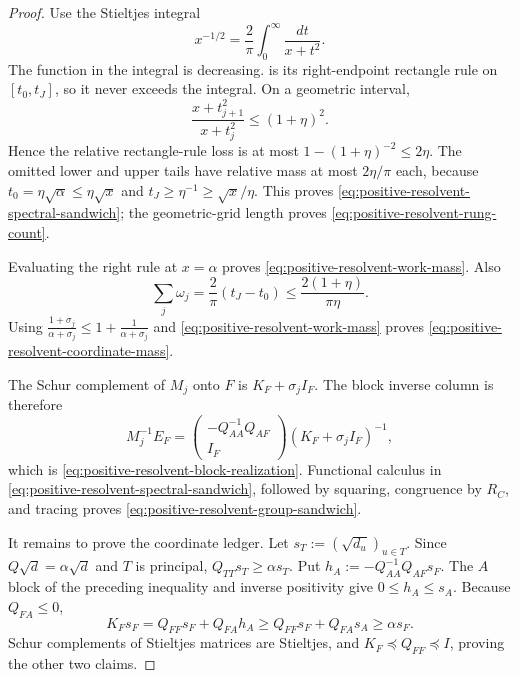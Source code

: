 \begin{proof}
Use the Stieltjes integral
\begin{equation*}
 x^{-1/2}=\frac2\pi\int_0^\infty\frac{dt}{x+t^2}.
\end{equation*}
The function in the integral is decreasing.
 is its right-endpoint rectangle rule on
$[t_0,t_J]$, so it never exceeds the integral.  On a geometric interval,
\begin{equation*}
 \frac{x+t_{j+1}^2}{x+t_j^2}\leq(1+\eta)^2.
\end{equation*}
Hence the relative rectangle-rule loss is at most
$1-(1+\eta)^{-2}\leq2\eta$.  The omitted lower and upper tails have relative
mass at most $2\eta/\pi$ each, because
$t_0=\eta\sqrt\alpha\leq\eta\sqrt x$ and
$t_J\geq\eta^{-1}\geq\sqrt x/\eta$.  This proves
\cref{eq:positive-resolvent-spectral-sandwich}; the geometric-grid length
proves
\cref{eq:positive-resolvent-rung-count}.

Evaluating the right rule at $x=\alpha$ proves
\cref{eq:positive-resolvent-work-mass}.  Also
\begin{equation*}
 \sum_j\omega_j
 =\frac2\pi(t_J-t_0)
 \leq\frac{2(1+\eta)}{\pi\eta}.
\end{equation*}
Using
$\frac{1+\sigma_j}{\alpha+\sigma_j}
 \leq 1+\frac1{\alpha+\sigma_j}$ and
\cref{eq:positive-resolvent-work-mass} proves
\cref{eq:positive-resolvent-coordinate-mass}.

The Schur complement of $M_j$ onto $F$ is
$K_F+\sigma_jI_F$.  The block inverse column is therefore
\begin{equation*}
 M_j^{-1}E_F
 =\begin{pmatrix}-Q_{AA}^{-1}Q_{AF}\\I_F\end{pmatrix}
  (K_F+\sigma_jI_F)^{-1},
\end{equation*}
which is
\cref{eq:positive-resolvent-block-realization}.  Functional calculus in
\cref{eq:positive-resolvent-spectral-sandwich}, followed by squaring,
congruence by $R_C$, and tracing proves
\cref{eq:positive-resolvent-group-sandwich}.

It remains to prove the coordinate ledger.  Let
$s_T:=(\sqrt{d_u})_{u\in T}$.  Since $Q\sqrt d=\alpha\sqrt d$ and $T$ is
principal, $Q_{TT}s_T\geq\alpha s_T$.  Put
$h_A:=-Q_{AA}^{-1}Q_{AF}s_F$.  The $A$ block of the preceding inequality and
inverse positivity give $0\leq h_A\leq s_A$.  Because $Q_{FA}\leq0$,
\begin{equation*}
 K_Fs_F=Q_{FF}s_F+Q_{FA}h_A
 \geq Q_{FF}s_F+Q_{FA}s_A
 \geq\alpha s_F.
\end{equation*}
Schur complements of Stieltjes matrices are Stieltjes, and
$K_F\preceq Q_{FF}\preceq I$, proving the other two claims.


\end{proof}
